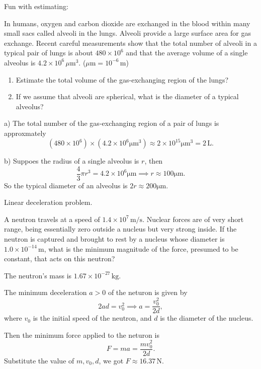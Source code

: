 \documentclass{article}
\begin{document}
\begin{problem}
Fun with estimating:

In humans, oxygen and carbon dioxide are exchanged in the blood within many small sacs called alveoli in the lungs. Alveoli provide a large surface area for gas exchange. Recent careful measurements show that the total number of alveoli in a typical pair of lungs is about $480 \times 10^{6}$ and that the average volume of a single alveolus is $4.2 \times 10^{6}\,\mu\mathrm{m}^{3}$. ($\mu\mathrm{m}=10^{-6}\,\mathrm{m}$)

\begin{enumerate}
  \item[a)] Estimate the total volume of the gas-exchanging region of the lungs?
  \item[b)] If we assume that alveoli are spherical, what is the diameter of a typical alveolus?
\end{enumerate}
\end{problem}

\begin{solution}
	a) The total number of the gas-exchanging region of a pair of lungs is approxmately 
	\[ (480 \times 10^6) \times (4.2 \times 10^{6} \mathrm{\mu m}^3) \approx 2 \times 10^{15} \mathrm{\mu m}^{3} = 2 \,\mathrm{L}. \]

	b) Suppoes the radius of a single alveolus is $r$, then 
	\[ \frac{4}{3}\pi r^3 = 4.2 \times 10^{6} \mathrm{\mu m} 
	\implies r \approx 100 \mathrm{\mu m}. \]
	So the typical diameter of an alveolus is $2r \approx 200 \mathrm{\mu m}$.
\end{solution}



\begin{problem}
Linear deceleration problem.

A neutron travels at a speed of $1.4 \times 10^{7}\,\mathrm{m/s}$. Nuclear forces are of very short range, being essentially zero outside a nucleus but very strong inside. If the neutron is captured and brought to rest by a nucleus whose diameter is $1.0 \times 10^{-14}\,\mathrm{m}$, what is the minimum magnitude of the force, presumed to be constant, that acts on this neutron?

The neutron's mass is $1.67 \times 10^{-27}\,\mathrm{kg}$.
\end{problem}

\begin{solution}
	The minimum deceleration $a>0$ of the neturon is given by
	\[ 2ad = v_0^2 \implies a = \frac{v_0^2}{2d}, \]
	where $v_0$ is the initial speed of the neutron, and $d$ is the diameter of the nucleus.

	Then the minimum force applied to the neturon is 
	\[ F = ma = \frac{mv_0^2}{2d}. \]
	Substitute the value of $m, v_0, d$, we got $F \approx 16.37\,\mathrm{N}$.
\end{solution}
\end{document}
